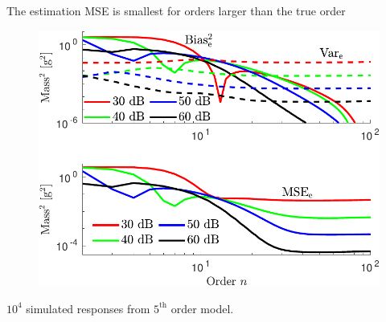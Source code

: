 \documentclass[presentation]{beamer}
\begin{document}
\begin{frame}[label={slide:experimental-validation4}]{The estimation MSE is smallest \linebreak for orders larger than the true order}
\begin{figure}
  \centering
  \includegraphics[width=0.65\columnwidth]{./fig/Exp_Fig_4.pdf} 
\end{figure}
\begin{itemize}
$10^4$ simulated responses from $5^{\text{th}}$ order model.
\end{itemize}
\end{frame}

\end{document}

